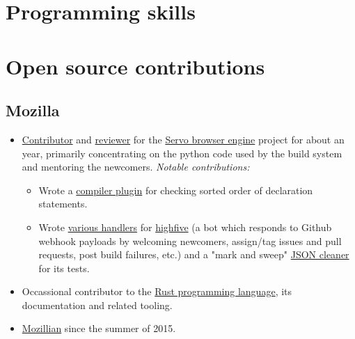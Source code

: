 \documentclass[11pt,a4paper,sans]{moderncv}        %
\newcommand\chref[3][linky]{\href{#2}{\color{#1}#3}}
\begin{document}
\section{Programming skills}

\newpage

\section{Open source contributions}
\subsection{Mozilla}
\begin{itemize}
\item \chref{https://github.com/servo/servo/commits?author=Wafflespeanut}{Contributor} and \chref{https://blog.servo.org/2016/01/11/twis-47/}{reviewer} for the \chref{https://github.com/servo/servo}{Servo browser engine} project for about an year, primarily concentrating on the python code used by the build system and mentoring the newcomers.
\newline
\textit{Notable contributions:}
\begin{itemize}
\item Wrote a \chref{https://github.com/Wafflespeanut/rust-sorty}{compiler plugin} for checking sorted order of declaration statements.
\item Wrote \chref{https://github.com/servo/highfive/commits?author=Wafflespeanut}{various handlers} for \chref{https://github.com/servo/highfive}{highfive} (a bot which responds to Github webhook payloads by welcoming newcomers, assign/tag issues and pull requests, post build failures, etc.) and a "mark and sweep" \chref{https://github.com/servo/highfive/pull/115}{JSON cleaner} for its tests.
\end{itemize}
\item Occassional contributor to the \chref{https://github.com/rust-lang/rust}{Rust programming language}, its documentation and related tooling.
\item \chref{https://mozillians.org/en-US/u/wafflespeanut}{Mozillian} since the summer of 2015.
\end{itemize}
\end{document}
